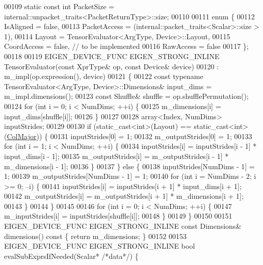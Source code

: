 \begin{DoxyCode}
00109   \textcolor{keyword}{static} \textcolor{keyword}{const} \textcolor{keywordtype}{int} PacketSize = internal::unpacket\_traits<PacketReturnType>::size;
00110 
00111   \textcolor{keyword}{enum} \{
00112     IsAligned = \textcolor{keyword}{false},
00113     PacketAccess = (internal::packet\_traits<Scalar>::size > 1),
00114     Layout = TensorEvaluator<ArgType, Device>::Layout,
00115     CoordAccess = \textcolor{keyword}{false},  \textcolor{comment}{// to be implemented}
00116     RawAccess = \textcolor{keyword}{false}
00117   \};
00118 
00119   EIGEN\_DEVICE\_FUNC EIGEN\_STRONG\_INLINE TensorEvaluator(\textcolor{keyword}{const} XprType& op, \textcolor{keyword}{const} Device& device)
00120       : m\_impl(op.expression(), device)
00121   \{
00122     \textcolor{keyword}{const} \textcolor{keyword}{typename} TensorEvaluator<ArgType, Device>::Dimensions& input\_dims = m\_impl.dimensions();
00123     \textcolor{keyword}{const} Shuffle& shuffle = op.shufflePermutation();
00124     \textcolor{keywordflow}{for} (\textcolor{keywordtype}{int} i = 0; i < NumDims; ++i) \{
00125       m\_dimensions[i] = input\_dims[shuffle[i]];
00126     \}
00127 
00128     array<Index, NumDims> inputStrides;
00129 
00130     \textcolor{keywordflow}{if} (static\_cast<int>(Layout) == static\_cast<int>(\hyperlink{group__enums_ggaacded1a18ae58b0f554751f6cdf9eb13a0cbd4bdd0abcfc0224c5fcb5e4f6669a}{ColMajor})) \{
00131       inputStrides[0] = 1;
00132       m\_outputStrides[0] = 1;
00133       \textcolor{keywordflow}{for} (\textcolor{keywordtype}{int} i = 1; i < NumDims; ++i) \{
00134         inputStrides[i] = inputStrides[i - 1] * input\_dims[i - 1];
00135         m\_outputStrides[i] = m\_outputStrides[i - 1] * m\_dimensions[i - 1];
00136       \}
00137     \} \textcolor{keywordflow}{else} \{
00138       inputStrides[NumDims - 1] = 1;
00139       m\_outputStrides[NumDims - 1] = 1;
00140       \textcolor{keywordflow}{for} (\textcolor{keywordtype}{int} i = NumDims - 2; i >= 0; --i) \{
00141         inputStrides[i] = inputStrides[i + 1] * input\_dims[i + 1];
00142         m\_outputStrides[i] = m\_outputStrides[i + 1] * m\_dimensions[i + 1];
00143       \}
00144     \}
00145 
00146     \textcolor{keywordflow}{for} (\textcolor{keywordtype}{int} i = 0; i < NumDims; ++i) \{
00147       m\_inputStrides[i] = inputStrides[shuffle[i]];
00148     \}
00149   \}
00150 
00151   EIGEN\_DEVICE\_FUNC EIGEN\_STRONG\_INLINE \textcolor{keyword}{const} Dimensions& dimensions()\textcolor{keyword}{ const }\{ \textcolor{keywordflow}{return} m\_dimensions; \}
00152 
00153   EIGEN\_DEVICE\_FUNC EIGEN\_STRONG\_INLINE \textcolor{keywordtype}{bool} evalSubExprsIfNeeded(Scalar* \textcolor{comment}{/*data*/}) \{

\end{DoxyCode}
